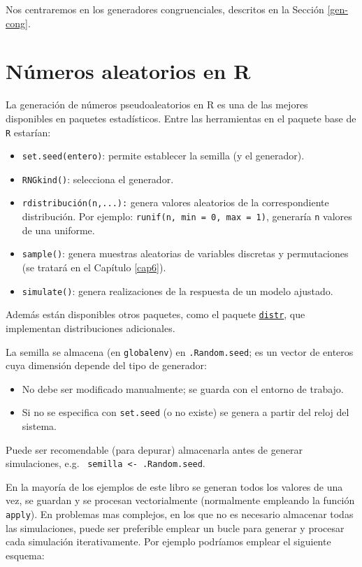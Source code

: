 \documentclass[
]{book}
\theoremstyle{break}
\theoremstyle{definition}
\theoremstyle{definition}
\theoremstyle{definition}
\theoremstyle{remark}
\let\BeginKnitrBlock\begin \let\EndKnitrBlock\end
\begin{document}
Nos centraremos en los generadores congruenciales, descritos en la Sección \ref{gen-cong}.

\hypertarget{cap2}{%
\chapter{Números aleatorios en R}\label{cap2}}

La generación de números pseudoaleatorios en R es una de las mejores
disponibles en paquetes estadísticos.
Entre las herramientas en el paquete base de \texttt{R} estarían:

\begin{itemize}
\item
  \texttt{set.seed(entero)}: permite establecer la semilla (y el
  generador).
\item
  \texttt{RNGkind()}: selecciona el generador.
\item
  \texttt{rdistribución(n,...):} genera valores aleatorios de la
  correspondiente distribución.
  Por ejemplo: \texttt{runif(n,\ min\ =\ 0,\ max\ =\ 1)}, generaría \texttt{n} valores de una uniforme.
\item
  \texttt{sample()}: genera muestras aleatorias de variables discretas y permutaciones (se tratará en el Capítulo \ref{cap6}).
\item
  \texttt{simulate()}: genera realizaciones de la respuesta de un modelo ajustado.
\end{itemize}

Además están disponibles otros paquetes, como el paquete \href{http://distr.r-forge.r-project.org}{\texttt{distr}},
que implementan distribuciones adicionales.

La semilla se almacena (en \texttt{globalenv}) en \texttt{.Random.seed}; es un vector
de enteros cuya dimensión depende del tipo de generador:

\begin{itemize}
\item
  No debe ser modificado manualmente; se guarda con el entorno
  de trabajo.
\item
  Si no se especifica con \texttt{set.seed} (o no existe) se genera a
  partir del reloj del sistema.
\end{itemize}

\BeginKnitrBlock{remark}
\iffalse{} {Nota: } \fi{}Puede ser recomendable (para depurar) almacenarla antes de generar simulaciones, e.g.~
\texttt{semilla\ \textless{}-\ .Random.seed}.
\EndKnitrBlock{remark}

En la mayoría de los ejemplos de este libro se generan todos los valores de una vez,
se guardan y se procesan vectorialmente (normalmente empleando la función \texttt{apply}).
En problemas mas complejos, en los que no es necesario almacenar todas las simulaciones,
puede ser preferible emplear un bucle para generar y procesar cada simulación iterativamente.
Por ejemplo podríamos emplear el siguiente esquema:
\end{document}
